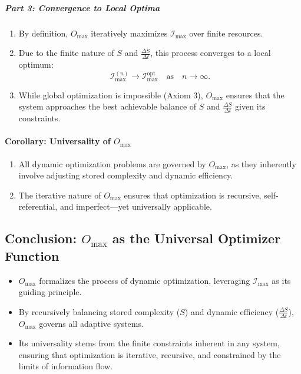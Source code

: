 \documentclass[12pt]{article}
\begin{document}
\subparagraph{Part 3: Convergence to Local Optima}
\begin{enumerate}
    \item By definition, \(O_{\text{max}}\) iteratively maximizes \(\mathcal{I}_{\text{max}}\) over finite resources.
    \item Due to the finite nature of \(S\) and \(\frac{\Delta S}{\Delta t}\), this process converges to a local optimum:
    \[
    \mathcal{I}_{\text{max}}^{(n)} \to \mathcal{I}_{\text{max}}^{\text{opt}} \quad \text{as} \quad n \to \infty.
    \]
    \item While global optimization is impossible (Axiom 3), \(O_{\text{max}}\) ensures that the system approaches the best achievable balance of \(S\) and \(\frac{\Delta S}{\Delta t}\) given its constraints.
\end{enumerate}

\paragraph{Corollary: Universality of \(O_{\text{max}}\)}
\begin{enumerate}
    \item All dynamic optimization problems are governed by \(O_{\text{max}}\), as they inherently involve adjusting stored complexity and dynamic efficiency.
    \item The iterative nature of \(O_{\text{max}}\) ensures that optimization is recursive, self-referential, and imperfect—yet universally applicable.
\end{enumerate}

\subsection{Conclusion: \(O_{\text{max}}\) as the Universal Optimizer Function}

\begin{itemize}
    \item \(O_{\text{max}}\) formalizes the process of dynamic optimization, leveraging \(\mathcal{I}_{\text{max}}\) as its guiding principle.
    \item By recursively balancing stored complexity (\(S\)) and dynamic efficiency (\(\frac{\Delta S}{\Delta t}\)), \(O_{\text{max}}\) governs all adaptive systems.
    \item Its universality stems from the finite constraints inherent in any system, ensuring that optimization is iterative, recursive, and constrained by the limits of information flow.
\end{itemize}
\end{document}
